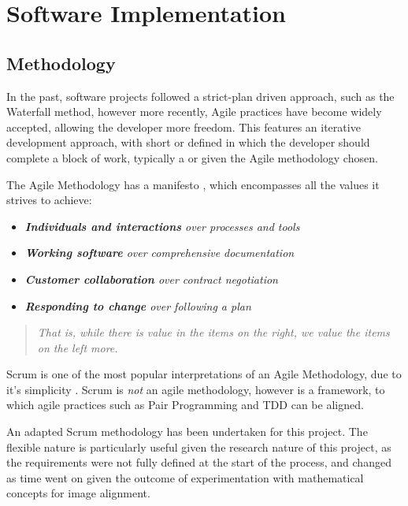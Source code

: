 \section{Software Implementation}

\subsection{Methodology}

In the past, software projects followed a strict-plan driven approach, such as the Waterfall method, however more recently, Agile practices have become widely accepted, allowing the developer more freedom. This features an iterative development approach, with short  or  defined in which the developer should complete a block of work, typically a  or  given the Agile methodology chosen.

The Agile Methodology has a manifesto \cite{Manifesto}, which encompasses all the values it strives to achieve:
\begin{itemize}
  \item \textit{\textbf{Individuals and interactions} over processes and tools}
  \item \textit{\textbf{Working software} over comprehensive documentation}
  \item \textit{\textbf{Customer collaboration} over contract negotiation}
  \item \textit{\textbf{Responding to change} over following a plan}
\end{itemize}

\begin{quotation}
  \textit{That is, while there is value in the items on the right, we value the items on the left more.}
\end{quotation}

Scrum is one of the most popular interpretations of an Agile Methodology, due to it's simplicity \cite{scrum}. Scrum is \textit{not} an agile methodology, however is a framework, to which agile practices such as Pair Programming and \acrfull{TDD} can be aligned.

An adapted Scrum methodology has been undertaken for this project. The flexible nature is particularly useful given the research nature of this project, as the requirements were not fully defined at the start of the process, and changed as time went on given the outcome of experimentation with mathematical concepts for image alignment.


